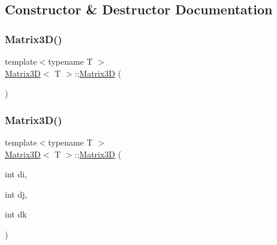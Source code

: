 \subsection{Constructor \& Destructor Documentation}
\mbox{\label{classMatrix3D_a1589c062f12fbbb1f3681f90c20c4b78_a1589c062f12fbbb1f3681f90c20c4b78}} 
\subsubsection{\texorpdfstring{Matrix3\+D()}{Matrix3D()}\hspace{0.1cm}{\footnotesize\ttfamily [1/3]}}
{\footnotesize\ttfamily template$<$typename T $>$ \\
\mbox{\hyperlink{classMatrix3D}{Matrix3D}}$<$ T $>$\+::\mbox{\hyperlink{classMatrix3D}{Matrix3D}} (\begin{DoxyParamCaption}{ }\end{DoxyParamCaption})}

\mbox{\label{classMatrix3D_a6c98f06b6f87c600bd9b00f6b253b37e_a6c98f06b6f87c600bd9b00f6b253b37e}} 
\subsubsection{\texorpdfstring{Matrix3\+D()}{Matrix3D()}\hspace{0.1cm}{\footnotesize\ttfamily [2/3]}}
{\footnotesize\ttfamily template$<$typename T $>$ \\
\mbox{\hyperlink{classMatrix3D}{Matrix3D}}$<$ T $>$\+::\mbox{\hyperlink{classMatrix3D}{Matrix3D}} (\begin{DoxyParamCaption}\item[{int}]{di,  }\item[{int}]{dj,  }\item[{int}]{dk }\end{DoxyParamCaption})}

\mbox{\label{classMatrix3D_a7fda610223910a2b4dcfea445d2eb6c7_a7fda610223910a2b4dcfea445d2eb6c7}} 
